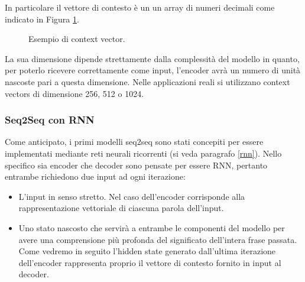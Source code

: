 \documentclass[12pt,a4paper,twoside,openright]{book}
\begin{document}
In particolare il vettore di contesto è un un array di numeri decimali come indicato in Figura \ref{fig:context_vec}.


\begin{figure}
    \centering
    \caption{Esempio di context vector.}
    \label{fig:context_vec}
\end{figure}


La sua dimensione dipende strettamente dalla complessità del modello in quanto, per poterlo ricevere correttamente come input, l'encoder avrà un numero di unità nascoste pari a questa dimensione. Nelle applicazioni reali si utilizzano context vectors di dimensione 256, 512 o 1024.



\subsubsection{Seq2Seq con RNN}
Come anticipato, i primi modelli seq2seq sono stati concepiti per essere implementati mediante reti neurali ricorrenti (si veda paragrafo \ref{rnn}). 
Nello specifico sia encoder che decoder sono pensate per essere RNN, pertanto entrambe richiedono due input ad ogni iterazione:
\begin{itemize}
    \item L'input in senso stretto. Nel caso dell'encoder corrisponde alla rappresentazione vettoriale di ciascuna parola dell'input. 
    \item Uno stato nascosto che servirà a entrambe le componenti del modello per avere una comprensione più profonda del significato dell'intera frase passata. Come vedremo in seguito l'hidden state generato dall'ultima iterazione dell'encoder rappresenta proprio il vettore di contesto fornito in input al decoder. 
\end{itemize}
\end{document}

